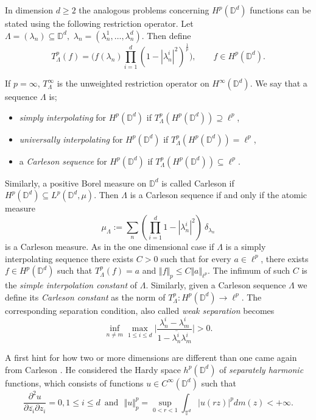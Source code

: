 \documentclass{amsart}
\numberwithin{equation}{section}
\newcommand{\D}{\mathbb{D}}
\begin{document}
In dimension $d\geq 2$ the analogous problems concerning $H^p(\mathbb{D}^d)$ functions can be stated using the following restriction operator. Let $\Lambda = (\lambda_n) \subseteq \mathbb{D}^d, \,\, \lambda_n=(\lambda_n^1,\dots,\lambda_n^d) $. Then define  
\begin{equation}
\label{eqn_restriction_operator}
T_\Lambda^p(f) = \Big( f(\lambda_n) \prod_{i=1}^d (1-|\lambda_n^i|^2)^{\frac1p} \Big), \qquad f \in H^p(\mathbb{D}^d). 
\end{equation}

If $p=\infty$, $T^\infty_\Lambda$ is the unweighted restriction operator on $H^\infty(\D^d)$. We say that a sequence $\Lambda$ is;
\begin{itemize}
\item[(SI)] \emph{simply interpolating} for $H^p(\mathbb{D}^d)$  if $T_\Lambda^p(H^p(\mathbb{D}^d))  \supseteq \ell^p $,
\item[(UI)] \emph{universally interpolating} for $H^p(\mathbb{D}^d)$ if $ T_\Lambda^p(H^p(\mathbb{D}^d))  = \ell^p$,  
\item[(CS)] a \emph{Carleson sequence} for $H^p(\mathbb{D}^d)$ if $T_\Lambda^p(H^p(\mathbb{D}^d)) \subseteq \ell^p.$ 
\end{itemize}

Similarly, a positive Borel measure on $\mathbb{D}^d$ is called Carleson if $H^p(\mathbb{D}^d)\subseteq L^p(\mathbb{D}^d,\mu).$ Then $\Lambda$ is a Carleson sequence if and only if the atomic measure 
\begin{equation}
    \label{eqn:muLambda}
    \mu_\Lambda:=\sum_n \left(\prod_{i=1}^d1-|\lambda_n^i|^2\right)~\delta_{\lambda_n}
\end{equation}
is a Carleson measure. As in the one dimensional case if $\Lambda$ is a simply interpolating sequence there exists $C>0$ such that for every $a\in \ell^p$, there exists $f\in H^p(\mathbb{D}^d)$ such that $T_\Lambda^p(f) = a $ and $\Vert f \Vert_p \leq C \Vert a \Vert_{\ell^p}$. The infimum of such $C$ is  the \emph{simple interpolation constant} of $\Lambda$. Similarly, given a Carleson sequence $\Lambda$ we define its \emph{Carleson constant} as the norm of $T^p_\Lambda: H^p(\mathbb{D}^d) \to \ell^p$.
The corresponding separation condition, also called { \it weak separation } becomes 
\[ \inf_{n\neq m } \max_{1\leq i\leq d}  \Big| \frac{\lambda^i_n-\lambda^i_m}{1-\overline{\lambda^i_n}\lambda^i_m} \Big|>0. \]

A first hint for how two or more dimensions are different than one came again from Carleson \cite{Carleson74}. He considered the  Hardy space $h^p(\mathbb{D}^d)$ of {\it separately harmonic} functions, which consists of functions $u\in C^\infty(\mathbb{D}^d) $  such that 
\[ \frac{\partial^2 u}{\partial \overline{z_i}\partial z_i} = 0, 1\leq i \leq d  \,\,\, \text{and} \,\,\,\, \Vert u \Vert^p_p = \sup_{0<r<1}\int_{\mathbb{T}^d}|u(rz)|^p dm(z) < + \infty. \]
\end{document}
